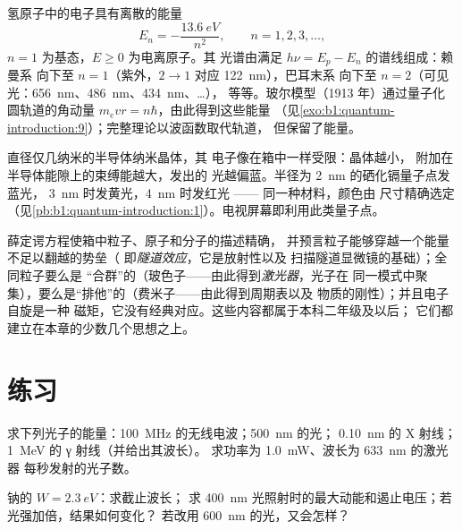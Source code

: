 \begin{proposition}[氢原子]\label{prop:b1:quantum-introduction:hydrogen}
氢原子中的电子具有离散的能量
\[
E_n = -\frac{\qty{13.6}{eV}}{n^2} , \qquad n = 1, 2, 3, \ldots ,
\]
$n = 1$ 为基态，$E \geq 0$ 为电离原子。其
光谱由满足 $h\nu = E_p - E_n$ 的谱线组成：赖曼系
向下至 $n = 1$（紫外，$2 \to 1$ 对应 \qty{122}{nm}），巴耳末系
向下至 $n = 2$（可见光：\qty{656}{nm}、\qty{486}{nm}、\qty{434}{nm}、\ldots），
等等。玻尔模型（1913 年）通过量子化
圆轨道的角动量 $m_evr = n\hbar$，由此得到这些能量
（见\cref{exo:b1:quantum-introduction:9}）；完整理论以波函数取代轨道，
但保留了能量。
\end{proposition}
\admitted

\begin{example}\label{ex:b1:quantum-introduction:dot}
直径仅几纳米的半导体纳米晶体，其
电子像在箱中一样受限：晶体越小，
附加在半导体能隙上的束缚能越大，发出的
光越偏蓝。半径为 \qty{2}{nm} 的硒化镉量子点发蓝光，
\qty{3}{nm} 时发黄光，\qty{4}{nm} 时发红光 —— 同一种材料，颜色由
尺寸精确选定（见\cref{pb:b1:quantum-introduction:1}）。电视屏幕即利用此类量子点。
\end{example}

\begin{remark}[理论其余部分的补充]\label{rem:b1:quantum-introduction:rest}
薛定谔方程使箱中粒子、原子和分子的描述精确，
并预言粒子能够穿越一个能量不足以翻越的势垒（
即\emph{隧道效应}，它是放射性以及
扫描隧道显微镜的基础）；全同粒子要么是
“合群”的（玻色子——由此得到\emph{激光器}，光子在
同一模式中聚集），要么是“排他”的（费米子——由此得到周期表以及
物质的刚性）；并且电子自旋是一种
磁矩，它没有经典对应。这些内容都属于本科二年级及以后；
它们都建立在本章的少数几个思想之上。
\end{remark}

\section{练习}

\begin{exercise}[$\star$]\label{exo:b1:quantum-introduction:1}
求下列光子的能量：\qty{100}{MHz} 的无线电波；\qty{500}{nm} 的光；
\qty{0.10}{nm} 的 X 射线；\qty{1}{MeV} 的 γ 射线（并给出其波长）。
求功率为 \qty{1.0}{mW}、波长为 \qty{633}{nm} 的激光器
每秒发射的光子数。
\end{exercise}

\begin{exercise}[$\star$]\label{exo:b1:quantum-introduction:2}
钠的 $W = \qty{2.3}{eV}$：求截止波长；
求 \qty{400}{nm} 光照射时的最大动能和遏止电压；若光强加倍，结果如何变化？
若改用 \qty{600}{nm} 的光，又会怎样？
\end{exercise}

